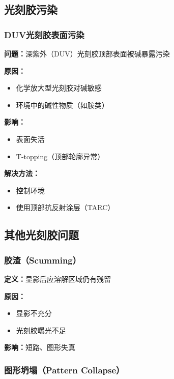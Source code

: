 \documentclass[UTF8,12pt,a4paper]{ctexart}
\begin{document}
\subsection{光刻胶污染}

\subsubsection{DUV光刻胶表面污染}

\textbf{问题：}深紫外（DUV）光刻胶顶部表面被碱暴露污染

\textbf{原因：}
\begin{itemize}
    \item 化学放大型光刻胶对碱敏感
    \item 环境中的碱性物质（如胺类）
\end{itemize}

\textbf{影响：}
\begin{itemize}
    \item 表面失活
    \item T-topping（顶部轮廓异常）
\end{itemize}

\textbf{解决方法：}
\begin{itemize}
    \item 控制环境
    \item 使用顶部抗反射涂层（TARC）
\end{itemize}

\subsection{其他光刻胶问题}

\subsubsection{胶渣（Scumming）}

\textbf{定义：}显影后应溶解区域仍有残留

\textbf{原因：}
\begin{itemize}
    \item 显影不充分
    \item 光刻胶曝光不足
\end{itemize}

\textbf{影响：}短路、图形失真

\subsubsection{图形坍塌（Pattern Collapse）}
\end{document}
